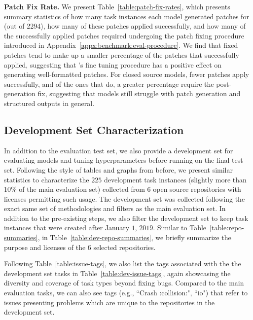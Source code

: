 

\textbf{Patch Fix Rate.} We present Table~\ref{table:patch-fix-rates}, which presents summary statistics of how many task instances each model generated patches for (out of 2294), how many of these patches applied successfully, and how many of the successfully applied patches required undergoing the patch fixing procedure introduced in Appendix~\ref{appx:benchmark:eval-procedure}.
We find that fixed patches tend to make up a smaller percentage of the \swellama{} patches that successfully applied, suggesting that \swellama{}'s fine tuning procedure has a positive effect on generating well-formatted patches.
For closed source models, fewer patches apply successfully, and of the ones that do, a greater percentage require the post-generation fix, suggesting that models still struggle with patch generation and structured outputs in general.



\subsection{Development Set Characterization}

In addition to the evaluation test set, we also provide a development set for evaluating models and tuning hyperparameters before running on the final test set.
Following the style of tables and graphs from before, we present similar statistics to characterize the $225$ development task instances (slightly more than $10$\% of the main evaluation set) collected from $6$ open source repositories with licenses permitting such usage.
The development set was collected following the exact same set of methodologies and filters as the main evaluation set.
In addition to the pre-existing steps, we also filter the development set to keep task instances that were created after January $1$, $2019$.
Similar to Table~\ref{table:repo-summaries}, in Table~\ref{table:dev-repo-summaries}, we briefly summarize the purpose and licenses of the $6$ selected repositories.



Following Table~\ref{table:issue-tags}, we also list the tags associated with the the development set tasks in Table~\ref{table:dev-issue-tags}, again showcasing the diversity and coverage of task types beyond fixing bugs.
Compared to the main evaluation tasks, we can also see tags (e.g., ``Crash :collision:", ``io") that refer to issues presenting problems which are unique to the repositories in the development set.

